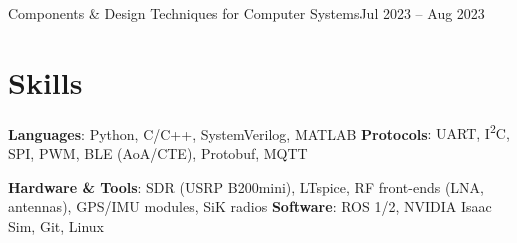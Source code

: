 \documentclass[letterpaper,10pt]{article}
\begin{document}
    \resumeCourseheading
      {Components \& Design Techniques for Computer Systems}{Jul 2023 -- Aug 2023}
      \resumeItemListStart
      \resumeItemListEnd

  \resumeSubHeadingListEnd

\section{Skills}
 \resumeSubHeadingListStart
   \item{
     \textbf{Languages}{: Python, C/C++, SystemVerilog, MATLAB}
     \hfill
     \textbf{Protocols}{: UART, I\textsuperscript{2}C, SPI, PWM, BLE (AoA/CTE), Protobuf, MQTT}
   }
   \item{
     \textbf{Hardware \& Tools}{: SDR (USRP B200mini), LTspice, RF front-ends (LNA, antennas), GPS/IMU modules, SiK radios}
     \hfill
     \textbf{Software}{: ROS 1/2, NVIDIA Isaac Sim, Git, Linux}
   }
 \resumeSubHeadingListEnd

\end{document}
